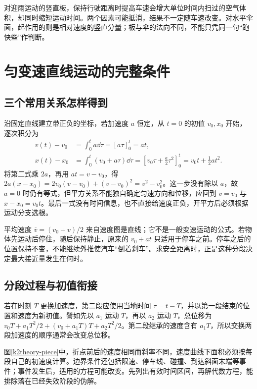 对迎雨运动的竖直板，保持行驶距离时提高车速会增大单位时间内扫过的空气体积，却同时缩短运动时间。两个因素可能抵消，结果不一定随车速改变。对水平伞面，起作用的则是相对速度的竖直分量；板与伞的法向不同，不能只凭同一句“跑快些”作判断。



\section{匀变速直线运动的完整条件}
\subsection{三个常用关系怎样得到}
沿固定直线建立带正负的坐标，若加速度 $a$ 恒定，从 $t=0$ 的初值 $v_0,x_0$ 开始，逐次积分为
\begin{align*}
 v(t)-v_0&=\int_0^t a\dd\tau=[a\tau]_0^t=at,\\
 x(t)-x_0&=\int_0^t(v_0+a\tau)\dd\tau
 =\left[v_0\tau+\frac a2\tau^2\right]_0^t
 =v_0t+\frac12at^2.
\end{align*}
将第二式乘 $2a$，再用 $at=v-v_0$，得 $2a(x-x_0)=2v_0(v-v_0)+(v-v_0)^2=v^2-v_0^2$。这一步没有除以 $a$，故 $a=0$ 时仍有等式，但平方关系不能独自确定匀速方向和位移，应回到 $v=v_0$ 与 $x-x_0=v_0t$。最后一式没有时间信息，也不直接给速度正负，开平方后必须根据运动分支选根。

平均速度 $\overline v=(v_0+v)/2$ 来自速度图是直线；它不是一般变速运动的公式。若物体先运动后停住，随后保持静止，原来的 $v_0+at$ 只适用于停车之前。停车之后的位置保持不变，不能继续外推使汽车“倒着刹车”。求安全距离时，正是这种分段决定最大接近量发生在何时。

\subsection{分段过程与初值衔接}
若在时刻 $T$ 更换加速度，第二段应使用当地时间 $\tau=t-T$，并以第一段结束的位置和速度为新初值。譬如先以 $a_1$ 运动 $T$，再以 $a_2$ 运动 $T$，总位移为 $v_0T+a_1T^2/2+(v_0+a_1T)T+a_2T^2/2$。第二段继承的速度含有 $a_1T$，所以交换两段加速度的顺序通常会改变总位移。

图\ref{k2theory-piece}中，折点前后的速度相同而斜率不同，速度曲线下面积必须按每段自己的初速度计算。边界条件还包括限速、停车线、碰撞、到达斜面末端等事件；事件发生后，适用的方程可能改变。先列出有效时间区间，再解代数方程，能排除落在已经失效阶段的伪解。


